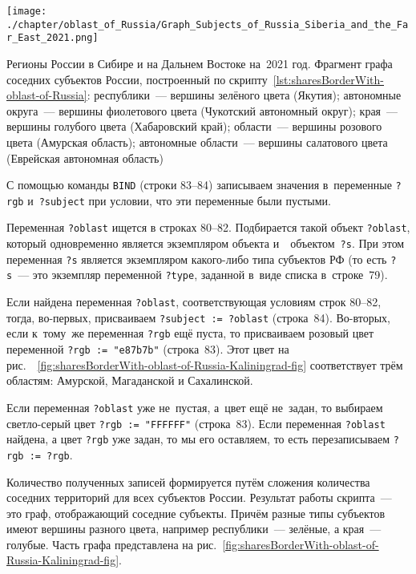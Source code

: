 \newpage
\begin{marginfigure}[0\baselineskip]
	\texttt{[image: ./chapter/oblast\_of\_Russia/Graph\_Subjects\_of\_Russia\_Siberia\_and\_the\_Far\_East\_2021.png]}
	\caption[Фрагмент графа субъектов России, 2021 год.]{Регионы России в Сибире и на Дальнем Востоке на~2021 год. 
    Фрагмент графа соседних субъектов России, 
    построенный по скрипту~\protect\ref{lst:sharesBorderWith-oblast-of-Russia}: 
	республики~--- вершины зелёного цвета (Якутия); 
	автономные округа~--- вершины фиолетового цвета (Чукотский автономный округ);
	края~--- вершины голубого цвета (Хабаровский край);
	области~--- вершины розового цвета (Амурская область);
	автономные области~--- вершины салатового цвета (Еврейская автономная область)}%
      \label{fig:sharesBorderWith-oblast-of-Russia-Kaliningrad-fig}%
\end{marginfigure}
%
С помощью команды \lstinline|BIND| (строки 83--84) 
записываем значения в~переменные \lstinline|?rgb| и~\mbox{\lstinline|?subject|} 
при условии, что эти переменные были пустыми. 

Переменная \lstinline|?oblast| ищется в строках 80--82. 
Подбирается такой объект \lstinline|?oblast|, 
который одновременно является 
экземпляром объекта  
и~~объектом~\lstinline|?s|. 
При этом переменная \lstinline|?s| является экземпляром какого-либо типа субъектов РФ 
(то есть \lstinline|?s|~--- это экземпляр переменной \lstinline|?type|, 
заданной в~виде списка в~строке~79).

Если найдена переменная \lstinline|?oblast|, 
соответствующая условиям строк 80--82, 
тогда, во-первых, присваиваем \lstinline|?subject := ?oblast| (строка~84). 
Во-вторых, если к~тому~же переменная \lstinline|?rgb| ещё пуста, 
то присваиваем розовый цвет переменной \lstinline|?rgb := "e87b7b"| (строка~83). 
Этот цвет на рис.~\protect~\ref{fig:sharesBorderWith-oblast-of-Russia-Kaliningrad-fig} 
соответствует трём областям: Амурской, Магаданской и Сахалинской. 

Если переменная \lstinline|?oblast| уже не~пустая, а~цвет ещё не~задан, 
то выбираем светло-серый цвет \lstinline|?rgb := "FFFFFF"| (строка~83).
Если переменная \lstinline|?oblast| найдена, а цвет \lstinline|?rgb| уже задан, 
то мы его оставляем, то есть перезаписываем \lstinline|?rgb := ?rgb|.

Количество полученных записей формируется путём сложения количества соседних территорий для всех субъектов России. 
Результат работы скрипта~--- это граф, 
отображающий соседние субъекты. 
Причём разные типы субъектов имеют вершины разного цвета, 
например республики~--- зелёные, а края~--- голубые. 
Часть графа представлена на рис.~\ref{fig:sharesBorderWith-oblast-of-Russia-Kaliningrad-fig}.%



